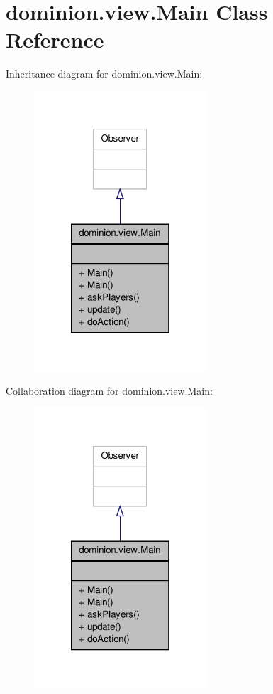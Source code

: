 \hypertarget{classdominion_1_1view_1_1Main}{\section{dominion.\-view.\-Main \-Class \-Reference}
\label{classdominion_1_1view_1_1Main}
}


\-Inheritance diagram for dominion.\-view.\-Main\-:
\nopagebreak
\begin{figure}[H]
\begin{center}
\leavevmode
\includegraphics[width=182pt]{classdominion_1_1view_1_1Main__inherit__graph}
\end{center}
\end{figure}


\-Collaboration diagram for dominion.\-view.\-Main\-:
\nopagebreak
\begin{figure}[H]
\begin{center}
\leavevmode
\includegraphics[width=182pt]{classdominion_1_1view_1_1Main__coll__graph}
\end{center}
\end{figure}
